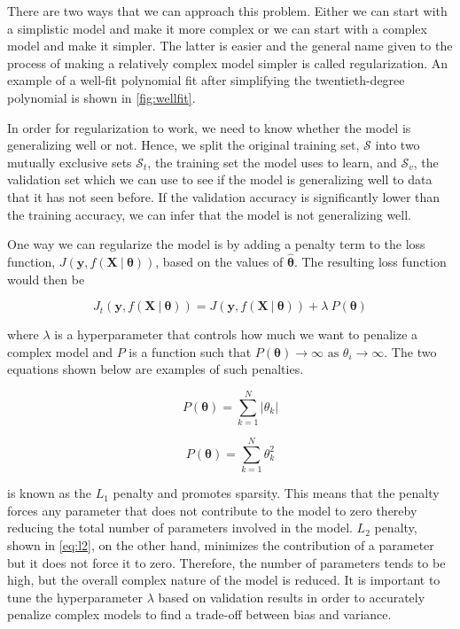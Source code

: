 \newpage

There are two ways that we can approach this problem. Either we can start with a simplistic model and make it more complex or we can start with a complex model and make it simpler. The latter is easier and the general name given to the process of making a relatively complex model simpler is called regularization. An example of a well-fit polynomial fit after simplifying the twentieth-degree polynomial is shown in \cref{fig:wellfit}.

In order for regularization to work, we need to know whether the model is generalizing well or not. Hence, we split the original training set, $\mathcal{S}$ into two mutually exclusive sets $\mathcal{S}_t$, the training set the model uses to learn, and $\mathcal{S}_v$, the validation set which we can use to see if the model is generalizing well to data that it has not seen before. If the validation accuracy is significantly lower than the training accuracy, we can infer that the model is not generalizing well.

One way we can regularize the model is by adding a penalty term to the loss function, $J(\mathbf{y}, f(\mathbf{X} \ | \ \boldsymbol{\theta}))$, based on the values of $\boldsymbol{\hat{\theta}}$. The resulting loss function would then be

\begin{equation}
	J_{t}(\mathbf{y}, f(\mathbf{X} \ | \ \boldsymbol{\theta})) = J(\mathbf{y}, f(\mathbf{X} \ | \ \boldsymbol{\theta})) + \lambda \ P(\boldsymbol{\theta})
\end{equation}

\noindent
where $\lambda$ is a hyperparameter that controls how much we want to penalize a complex model and $P$ is a function such that $P(\boldsymbol{\theta}) \rightarrow \infty \text{ as } \theta_i \rightarrow \infty$. The two equations shown below are examples of such penalties. 


\begin{equation}
	\label{eq:l1}
	P(\boldsymbol{\boldsymbol{\theta}}) = \sum_{k = 1}^{N}{|\theta_k|}
\end{equation}

\begin{equation}
	\label{eq:l2}
	P(\boldsymbol{\theta}) = \sum_{k = 1}^{N}{\theta_k^2}
\end{equation}


 is known as the $L_1$ penalty and promotes sparsity. This means that the penalty forces any parameter that does not contribute to the model to zero thereby reducing the total number of parameters involved in the model. $L_2$ penalty, shown in \cref{eq:l2}, on the other hand, minimizes the contribution of a parameter but it does not force it to zero. Therefore, the number of parameters tends to be high, but the overall complex nature of the model is reduced. It is important to tune the hyperparameter $\lambda$ based on validation results in order to accurately penalize complex models to find a trade-off between bias and variance. 


